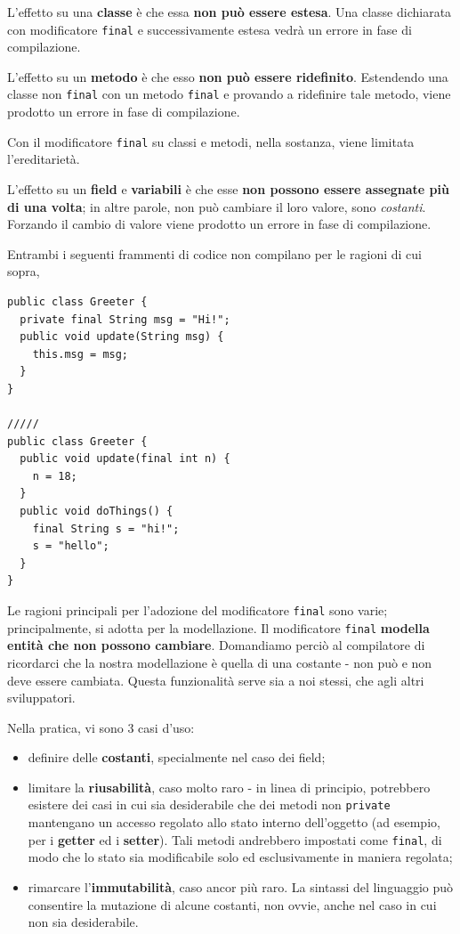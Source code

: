 \documentclass[\fontsizeclass,twocolumn]{\classname}
\theoremstyle{definition}
\theoremstyle{definition}
\begin{document}
L'effetto su una \textbf{classe} è che essa \textbf{non può essere estesa}. Una
classe dichiarata con modificatore \texttt{final} e successivamente estesa
vedrà un errore in fase di compilazione.

L'effetto su un \textbf{metodo} è che esso \textbf{non può essere ridefinito}.
Estendendo una classe non \texttt{final} con un metodo \texttt{final} e
provando a ridefinire tale metodo, viene prodotto un errore in fase di
compilazione.

Con il modificatore \texttt{final} su classi e metodi, nella sostanza, viene
limitata l'ereditarietà.

L'effetto su un \textbf{field} e \textbf{variabili} è che esse \textbf{non
possono essere assegnate più di una volta}; in altre parole, non può cambiare
il loro valore, sono \emph{costanti}. Forzando il cambio di valore viene
prodotto un errore in fase di compilazione.

Entrambi i seguenti frammenti di codice non compilano per le ragioni di cui
sopra,

\begin{lstlisting}
public class Greeter {
  private final String msg = "Hi!";
  public void update(String msg) {
    this.msg = msg;
  }
}

/////
public class Greeter {
  public void update(final int n) {
    n = 18;
  }
  public void doThings() {
    final String s = "hi!";
    s = "hello";
  }
}
\end{lstlisting}

Le ragioni principali per l'adozione del modificatore \texttt{final} sono
varie; principalmente, si adotta per la modellazione. Il modificatore
\texttt{final} \textbf{modella entità che non possono cambiare}. Domandiamo
perciò al compilatore di ricordarci che la nostra modellazione è quella di una
costante \-- non può e non deve essere cambiata. Questa funzionalità serve sia
a noi stessi, che agli altri sviluppatori.

Nella pratica, vi sono 3 casi d'uso:
\begin{itemize}
    \item definire delle \textbf{costanti}, specialmente nel caso dei field;
    \item limitare la \textbf{riusabilità}, caso molto raro \-- in linea di
        principio, potrebbero esistere dei casi in cui sia desiderabile che dei
        metodi non \texttt{private} mantengano un accesso regolato allo stato
        interno dell'oggetto (ad esempio, per i \textbf{getter} ed i
        \textbf{setter}). Tali metodi andrebbero impostati come \texttt{final},
        di modo che lo stato sia modificabile solo ed esclusivamente in maniera
        regolata;
    \item rimarcare l'\textbf{immutabilità}, caso ancor più raro. La sintassi
        del linguaggio può consentire la mutazione di alcune costanti, non
        ovvie, anche nel caso in cui non sia desiderabile.
\end{itemize}
\end{document}
